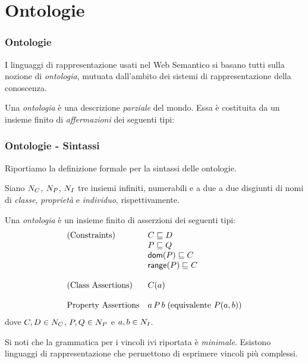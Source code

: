 \documentclass[8pt]{beamer}
\begin{document}
\section{Ontologie}

\begin{frame}
 \frametitle{Ontologie}
 
 I linguaggi di rappresentazione usati nel Web Semantico
 si basano tutti sulla nozione di \emph{ontologia}, mutuata
 dall'ambito dei sistemi di rappresentazione della conoscenza.
 \vspace{\baselineskip}

 Una \emph{ontologia} \`e una descrizione \emph{parziale} del mondo.
 Essa \`e costituita da un insieme finito di \emph{affermazioni}
 dei seguenti tipi:
 \vspace{\baselineskip}



\end{frame}

\begin{frame}
\frametitle{Ontologie - Sintassi}

Riportiamo la definizione formale per la sintassi delle ontologie.
\vspace{\baselineskip}

Siano $N_C$, $N_P$, $N_I$ tre insiemi infiniti, numerabili e 
a due a due disgiunti di nomi di \emph{classe}, \emph{propriet\`a} e \emph{individuo},
rispettivamente.
\vspace{\baselineskip}

Una \emph{ontologia} \`e un insieme finito di asserzioni dei seguenti tipi:
\[
 \begin{array}{ll}
  \mbox{(Constraints)} & C \sqsubseteq D\\
  & P \sqsubseteq Q \\
  & \mathsf{dom}(P) \sqsubseteq C \\
  & \mathsf{range}(P) \sqsubseteq C \\
  &\\
  \mbox{(Class Assertions)} & C(a)\\
  &\\
  \mbox{Property Assertions} & a\,P\,b\;(\mbox{equivalente }P(a,b))\\
 \end{array}
\]
dove $C, D \in N_C$, $P, Q \in N_P$ e $a, b \in N_I$.
\vspace{\baselineskip}

Si noti che la grammatica per i vincoli ivi riportata \`e \emph{minimale}.
Esistono linguaggi di rappresentazione che permettono di esprimere vincoli
pi\`u complessi.
\end{frame}
\end{document}
